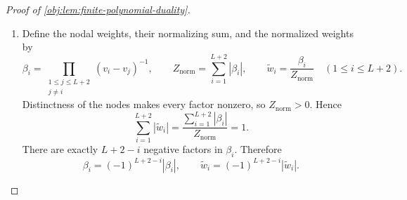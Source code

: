 \documentclass[11pt]{article}
\begin{document}
\begin{proof}[Proof of \cref{obj:lem:finite-polynomial-duality}]
\begin{enumerate}
\[\begin{aligned}
+t_{\mathrm{imp}}^2Q_{\mathrm{sgn}}(v)^2\\
&<\rho(v)^2
\le\mathcal E_{\mathrm{app}}^2.
\end{aligned}
\]
For \(v\in[v_-,v_+]\setminus\mathcal H_{\mathrm{imp}}\),
\[
\begin{aligned}
|\rho(v)-t_{\mathrm{imp}}Q_{\mathrm{sgn}}(v)|
&\le|\rho(v)|+t_{\mathrm{imp}}|Q_{\mathrm{sgn}}(v)|\\
&<c_{\mathrm{imp}}
+\frac{\mathcal E_{\mathrm{app}}-c_{\mathrm{imp}}}{2}
<\mathcal E_{\mathrm{app}}.
\end{aligned}
\]
The perturbed residual is continuous on the compact interval, so these pointwise strict inequalities imply
\[
\|\rho-t_{\mathrm{imp}}Q_{\mathrm{sgn}}\|_\infty
<\mathcal E_{\mathrm{app}}.
\]
But the polynomial
\[
Q_{\mathrm{imp}}=Q_*+t_{\mathrm{imp}}Q_{\mathrm{sgn}}
\]
has degree at most \(L\), and hence
\[
\mathcal E_{\mathrm{app}}
\le\|g-Q_{\mathrm{imp}}\|_\infty
=\|\rho-t_{\mathrm{imp}}Q_{\mathrm{sgn}}\|_\infty
<\mathcal E_{\mathrm{app}},
\]
a contradiction.

Thus, when \(\mathcal E_{\mathrm{app}}>0\), there exist increasing interval nodes \(v_1,\ldots,v_{L+2}\) with alternating residual values. Define their orientation by
\[
\eta=\frac{\rho(v_1)}{\mathcal E_{\mathrm{app}}}\in\{-1,1\}.
\]
Together with the zero-error construction, we have in both cases
\[
v_-\le v_1<\cdots<v_{L+2}\le v_+,
\qquad
\eta\in\{-1,1\},
\qquad
\rho(v_i)=\eta(-1)^{i-1}\mathcal E_{\mathrm{app}}.
\]

\item Define the nodal weights, their normalizing sum, and the normalized weights by
\[
\beta_i
=
\prod_{\substack{1\le j\le L+2\\j\ne i}}(v_i-v_j)^{-1},
\qquad
Z_{\mathrm{norm}}=\sum_{i=1}^{L+2}|\beta_i|,
\qquad
\widetilde w_i=\frac{\beta_i}{Z_{\mathrm{norm}}}
\quad(1\le i\le L+2).
\]
Distinctness of the nodes makes every factor nonzero, so \(Z_{\mathrm{norm}}>0\). Hence
\[
\sum_{i=1}^{L+2}|\widetilde w_i|
=
\frac{\sum_{i=1}^{L+2}|\beta_i|}{Z_{\mathrm{norm}}}
=1.
\]
There are exactly \(L+2-i\) negative factors in \(\beta_i\). Therefore
\[
\beta_i=(-1)^{L+2-i}|\beta_i|,
\qquad
\widetilde w_i=(-1)^{L+2-i}|\widetilde w_i|.
\]


\end{enumerate}
\end{proof}
\end{document}
